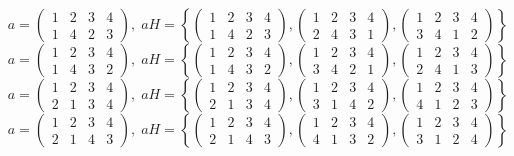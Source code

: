 \documentclass[a4paper,12pt]{article}
\begin{document}
\begin{itemize}
\[a = \begin{pmatrix} 1 & 2 & 3 & 4 \\ 1&4&2&3\end{pmatrix}, \; aH = \left\{\begin{pmatrix} 1 & 2 & 3 & 4 \\ 1&4&2&3\end{pmatrix}, \begin{pmatrix} 1 & 2 & 3 & 4 \\ 2&4&3&1\end{pmatrix}, \begin{pmatrix} 1 & 2 & 3 & 4 \\ 3&4&1&2\end{pmatrix} \right\}\]
\[a = \begin{pmatrix} 1 & 2 & 3 & 4 \\ 1&4&3&2\end{pmatrix}, \; aH = \left\{\begin{pmatrix} 1 & 2 & 3 & 4 \\ 1&4&3&2\end{pmatrix}, \begin{pmatrix} 1 & 2 & 3 & 4 \\ 3&4&2&1\end{pmatrix}, \begin{pmatrix} 1 & 2 & 3 & 4 \\ 2&4&1&3\end{pmatrix} \right\}\]
\[a = \begin{pmatrix} 1 & 2 & 3 & 4 \\ 2&1&3&4\end{pmatrix}, \; aH = \left\{\begin{pmatrix} 1 & 2 & 3 & 4 \\ 2&1&3&4\end{pmatrix}, \begin{pmatrix} 1 & 2 & 3 & 4 \\ 3&1&4&2\end{pmatrix}, \begin{pmatrix} 1 & 2 & 3 & 4 \\ 4&1&2&3\end{pmatrix} \right\}\]
\[a = \begin{pmatrix} 1 & 2 & 3 & 4 \\ 2&1&4&3\end{pmatrix}, \; aH = \left\{\begin{pmatrix} 1 & 2 & 3 & 4 \\ 2&1&4&3\end{pmatrix}, \begin{pmatrix} 1 & 2 & 3 & 4 \\ 4&1&3&2\end{pmatrix}, \begin{pmatrix} 1 & 2 & 3 & 4 \\ 3&1&2&4\end{pmatrix} \right\}\]

\end{itemize}
\end{document}
